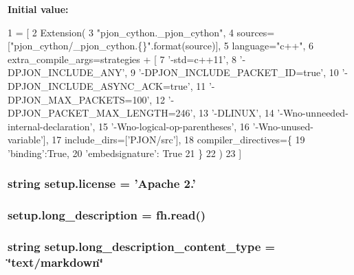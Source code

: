 {\bfseries Initial value\-:}
\begin{DoxyCode}
1 = [
2         Extension(
3             \textcolor{stringliteral}{"pjon\_cython.\_pjon\_cython"},
4             sources=[\textcolor{stringliteral}{"pjon\_cython/\_pjon\_cython.\{\}"}.format(source)],
5             language=\textcolor{stringliteral}{"c++"},
6             extra\_compile\_args=strategies + [
7                 \textcolor{stringliteral}{'-std=c++11'},
8                 \textcolor{stringliteral}{'-DPJON\_INCLUDE\_ANY'},
9                 \textcolor{stringliteral}{'-DPJON\_INCLUDE\_PACKET\_ID=true'},
10                 \textcolor{stringliteral}{'-DPJON\_INCLUDE\_ASYNC\_ACK=true'},
11                 \textcolor{stringliteral}{'-DPJON\_MAX\_PACKETS=100'},
12                 \textcolor{stringliteral}{'-DPJON\_PACKET\_MAX\_LENGTH=246'},
13                 \textcolor{stringliteral}{'-DLINUX'},
14                 \textcolor{stringliteral}{'-Wno-unneeded-internal-declaration'},
15                 \textcolor{stringliteral}{'-Wno-logical-op-parentheses'},
16                 \textcolor{stringliteral}{'-Wno-unused-variable'}],
17             include\_dirs=[\textcolor{stringliteral}{'PJON/src'}],
18         compiler\_directives=\{
19             \textcolor{stringliteral}{'binding'}:\textcolor{keyword}{True},
20             \textcolor{stringliteral}{'embedsignature'}: \textcolor{keyword}{True}
21         \}
22         )
23     ]
\end{DoxyCode}
\hypertarget{namespacesetup_aae5aa7c9d1cf462778a54e8f6a874c6f}{
\subsubsection[{license}]{\setlength{\rightskip}{0pt plus 5cm}string setup.\-license = 'Apache 2.'}}\label{namespacesetup_aae5aa7c9d1cf462778a54e8f6a874c6f}
\hypertarget{namespacesetup_a4cda9dbfb952875376a0749fe08a5bde}{
\subsubsection[{long\-\_\-description}]{\setlength{\rightskip}{0pt plus 5cm}setup.\-long\-\_\-description = fh.\-read()}}\label{namespacesetup_a4cda9dbfb952875376a0749fe08a5bde}
\hypertarget{namespacesetup_ab8573970d095ad95021130f3f717825b}{
\subsubsection[{long\-\_\-description\-\_\-content\-\_\-type}]{\setlength{\rightskip}{0pt plus 5cm}string setup.\-long\-\_\-description\-\_\-content\-\_\-type = \char`\"{}text/markdown\char`\"{}}}\label{namespacesetup_ab8573970d095ad95021130f3f717825b}

